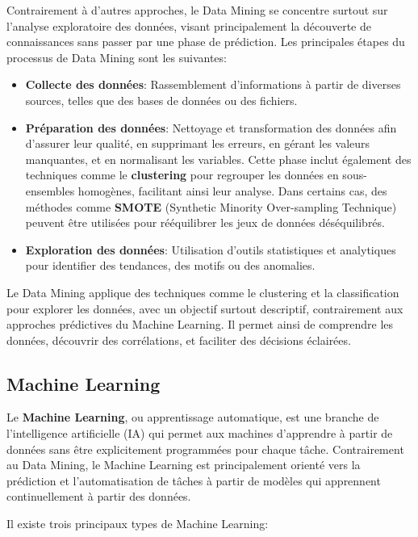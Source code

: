 Contrairement à d'autres approches, le Data Mining se concentre surtout sur l'analyse exploratoire des données, visant principalement la découverte de connaissances sans passer par une phase de prédiction.
Les principales étapes du processus de Data Mining sont les suivantes:

\begin{itemize}
    \item \textbf{Collecte des données}: Rassemblement d'informations à partir de diverses sources, telles que des bases de données ou des fichiers.
    \item \textbf{Préparation des données}: Nettoyage et transformation des données afin d'assurer leur qualité, en supprimant les erreurs, en gérant les valeurs manquantes, et en normalisant les variables. Cette phase inclut également des techniques comme le \textbf{clustering} pour regrouper les données en sous-ensembles homogènes, facilitant ainsi leur analyse. Dans certains cas, des méthodes comme \textbf{SMOTE} (Synthetic Minority Over-sampling Technique) peuvent être utilisées pour rééquilibrer les jeux de données déséquilibrés.
    \item \textbf{Exploration des données}: Utilisation d'outils statistiques et analytiques pour identifier des tendances, des motifs ou des anomalies.
\end{itemize}


Le Data Mining applique des techniques comme le clustering et la classification pour explorer les données, avec un objectif surtout descriptif, contrairement aux approches prédictives du Machine Learning. Il permet ainsi de comprendre les données, découvrir des corrélations, et faciliter des décisions éclairées.
\subsection{Machine Learning}

Le \textbf{Machine Learning}, ou apprentissage automatique, est une branche de l'intelligence artificielle (IA) qui permet aux machines d'apprendre à partir de données sans être explicitement programmées pour chaque tâche. Contrairement au Data Mining, le Machine Learning est principalement orienté vers la prédiction et l'automatisation de tâches à partir de modèles qui apprennent continuellement à partir des données.

Il existe trois principaux types de Machine Learning:

